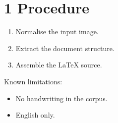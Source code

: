 \documentclass{article}
\begin{document}
\section*{1 Procedure}

\begin{enumerate}
    \item Normalise the input image.
    \item Extract the document structure.
    \item Assemble the LaTeX source.
\end{enumerate}

Known limitations:

\begin{itemize}
    \item No handwriting in the corpus.
    \item English only.
\end{itemize}
\end{document}
